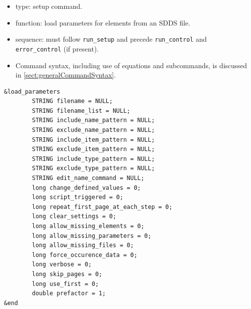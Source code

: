 \documentclass[11pt]{article}
\begin{document}
\begin{itemize}
\item type: setup command.
\item function: load parameters for elements from an SDDS file.
\item sequence: must follow \verb|run_setup| and precede \verb|run_control| and \verb|error_control| (if present).
\item Command syntax, including use of equations and subcommands, is discussed in \ref{sect:generalCommandSyntax}.
\end{itemize}

\begin{verbatim}
&load_parameters
        STRING filename = NULL;
        STRING filename_list = NULL;
        STRING include_name_pattern = NULL;
        STRING exclude_name_pattern = NULL;
        STRING include_item_pattern = NULL;
        STRING exclude_item_pattern = NULL;
        STRING include_type_pattern = NULL;
        STRING exclude_type_pattern = NULL;
        STRING edit_name_command = NULL;
        long change_defined_values = 0;
        long script_triggered = 0;
        long repeat_first_page_at_each_step = 0;
        long clear_settings = 0;
        long allow_missing_elements = 0;
        long allow_missing_parameters = 0;
        long allow_missing_files = 0;
        long force_occurence_data = 0;
        long verbose = 0;
        long skip_pages = 0;
        long use_first = 0;
        double prefactor = 1;
&end
\end{verbatim}
\end{document}
